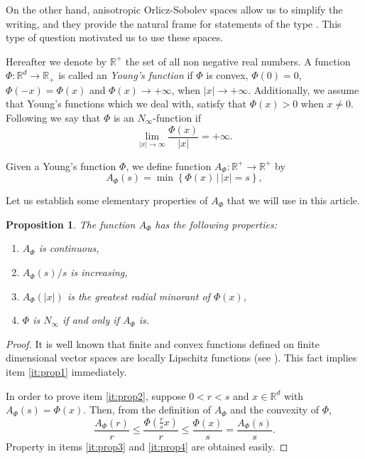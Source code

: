 \documentclass[twoside]{article}
\newtheorem{prop}[thm]{Proposition}
\theoremstyle{remark}
\newcommand{\rr}{\mathbb{R}}
\renewcommand{\leq}{\leqslant}
\begin{document}
On the other hand, anisotropic Orlicz-Sobolev spaces allow us to simplify the writing, and they provide the natural frame for statements of the type \cite[Lemma 3.1]{Tian2007192}. This type of question motivated us to use these spaces.

Hereafter we denote  by $\mathbb{R}^+$  the set of all non negative real numbers. A function $\Phi:\mathbb{R}^d\to \mathbb{R}_+ $ is called an \emph{Young's function} if $\Phi$ is convex, $\Phi(0)=0$, $\Phi(-x)=\Phi(x)$ and $\Phi(x)\to +\infty$, when $|x|\to+\infty$. Additionally, we assume that  Young's functions which we deal with, satisfy that $\Phi(x)>0$ when $x\neq 0$. Following \cite{Orliczvectorial2005} we say that $\Phi$ is an $N_{\infty}$-function  if
\[\lim_{|x|\to\infty}\frac{\Phi(x)}{|x|}=+\infty.\]

Given a Young's function $\Phi$, we define function $A_{\Phi}:\rr^+\to\rr^+$ by
\begin{equation}\label{eq:inversa-gral}
A_{\Phi}(s)=\min\left\{\Phi(x)\,\big|\,|x|=s\right\},
\end{equation}

Let us establish some elementary properties of $A_{\Phi}$ that we will use in this article.
\begin{prop}\label{prop:AsubPhi} The function $A_{\Phi}$ has the following properties:
\begin{enumerate}
 \item\label{it:prop1} $A_{\Phi}$ is continuous,
 \item\label{it:prop2} $A_{\Phi}(s)/s$ is increasing,
 \item\label{it:prop3} $A_{\Phi}(|x|)$ is the \emph{greatest radial minorant} of 
 $\Phi(x)$,
 \item\label{it:prop4} $\Phi$ is $N_{\infty}$ if and only if $A_{\Phi}$ is.
\end{enumerate}
\end{prop}

\begin{proof} It is well known that finite and convex functions defined on finite dimensional 
vector spaces are locally Lipschitz functions (see \cite{clarke2013functional}). This fact 
implies item \ref{it:prop1} immediately. 

In order to prove item \ref{it:prop2}, suppose $0<r<s$ and $x\in\rr^d$ with $A_{\Phi}(s)
=\Phi(x)$. Then, from the definition of $A_{\Phi}$ and the convexity of $\Phi$,
\[\frac{A_{\Phi}(r)}{r}\leq \frac{\Phi\left(\frac{r}{s}x\right)}{r}\leq \frac{\Phi\left(x\right)}{s}=
 \frac{A_{\Phi}(s)}{s}.
\]
Property in items \ref{it:prop3} and \ref{it:prop4} are obtained easily.

 
\end{proof}
\end{document}
